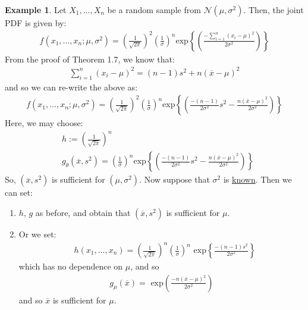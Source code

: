 \documentclass[11pt]{scrartcl}
\theoremstyle{definition}
\newtheorem{ex}{Example}
\theoremstyle{remark}
\begin{document}
{ \begin{ex}
 Let $X_1, ..., X_n$ be a random sample from $\mathcal{N}(\mu, \sigma^2)$.  Then, the joint PDF is given by: 
 \begin{align*}
 		f(x_1, ..., x_n; \mu, \sigma^2) = \left( \frac{1}{\sqrt{2 \pi}} \right)^2 \left( \frac{1}{\sigma} \right)^n \text{exp} \left\{ \left( \frac{-\sum_{i=1}^n (x_i - \mu)^2}{2 \sigma^2} \right) \right\}
 \end{align*}	
 From the proof of Theorem 1.7, we know that: 
 \begin{align*}
 	\sum_{i=1}^n (x_i - \mu)^2 = (n-1)s^2 + n(\overline{x} - \mu)^2
 \end{align*}
 and so we can re-write the above as: 
 \begin{align*}
  		f(x_1, ..., x_n; \mu, \sigma^2) = \left( \frac{1}{\sqrt{2 \pi}} \right)^2 \left( \frac{1}{\sigma} \right)^n \text{exp} \left\{ \left( \frac{-(n-1)}{2 \sigma^2} s^2 - \frac{n(\overline{x}-\mu)^2}{2 \sigma^2} \right) \right\}	
 \end{align*}
 Here, we may choose: 
 \begin{align*}
 		& h := \left( 	\frac{1}{\sqrt{2 \pi}}	\right)^n  \\
 		& g_\theta (\overline{x}, s^2) = \left(  \frac{1}{\sigma}		\right)^n \text{exp} \left\{ \left( \frac{-(n-1)}{2 \sigma^2} s^2 - \frac{n(\overline{x}-\mu)^2}{2 \sigma^2} \right) \right\}	
 \end{align*}
 So, $(\overline{x}, s^2)$ is sufficient for $(\mu, \sigma^2)$. Now suppose that $\sigma^2$ is \underline{known}. Then we can set: 
	\begin{enumerate}[noitemsep]
		\item $h$, $g$ as before, and obtain that $(\overline{x}, s^2)$ is sufficient for $\mu$. 
		\item Or we set: 
		\begin{align*}
			& h(x_1, ..., x_n) = \left( \frac{1}{\sqrt{2 \pi}} \right)^n \left( \frac{1}{\sigma} \right)^n \text{ exp} \left\{ \frac{-(n-1)s^2}{2 \sigma^2} \right\} 
		\end{align*}
		which has no dependence on $\mu$, and so
		\begin{align*}
			g_\mu( \overline{x}) = \text{ exp} \left( 	\frac{-n(\overline{x} - \mu)^2}{2 \sigma^2}	\right) 
		\end{align*}
		and so $\overline{x}$ is sufficient for $\mu$. 
	\end{enumerate}
 \end{ex}
 
}
\end{document}
